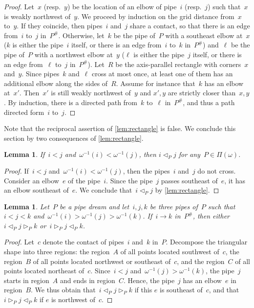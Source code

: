 \documentclass{amsart}
\newtheorem{lemma}[theorem]{Lemma}
\theoremstyle{definition}
\newcommand{\pipeDreams}{\Pi} %
\newcommand{\contact}{^\#} %
\newcommand{\less}{\vartriangleleft} %
\newcommand{\more}{\vartriangleright} %
\newcommand{\contactLess}[1]{\less_{#1}} %
\newcommand{\contactMore}[1]{\more_{#1}} %
\begin{document}
\begin{proof}
Let~$x$ (resp.~$y$) be the location of an elbow of pipe~$i$ (resp.~$j$) such that~$x$ is weakly northwest of~$y$.
We proceed by induction on the grid distance from~$x$ to~$y$.
If they coincide, then pipes~$i$ and~$j$ share a contact, so that there is an edge from~$i$ to~$j$ in~$P\contact$.
Otherwise, let~$k$ be the pipe of~$P$ with a southeast elbow at~$x$ ($k$ is either the pipe~$i$ itself, or there is an edge from~$i$ to~$k$ in~$P\contact$) and~$\ell$ be the pipe of~$P$ with a northwest elbow at~$y$ ($\ell$ is either the pipe~$j$ itself, or there is an edge from~$\ell$ to~$j$ in~$P\contact$).
Let~$R$ be the axis-parallel rectangle with corners~$x$ and~$y$.
Since pipes~$k$ and~$\ell$ cross at most once, at least one of them has an additional elbow along the sides of~$R$.
Assume for instance that~$k$ has an elbow at~$x'$.
Then~$x'$ is still weakly northwest of~$y$ and $x',y$ are strictly closer than~$x,y$.
By induction, there is a directed path from~$k$ to~$\ell$ in~$P\contact$, and thus a path directed form~$i$ to~$j$.
\end{proof}

Note that the reciprocal assertion of \cref{lem:rectangle} is false.
We conclude this section by two consequences of \cref{lem:rectangle}.

\begin{lemma}
\label{lem:consequenceRectangle1}
If~$i < j$ and~$\omega^{-1}(i) < \omega^{-1}(j)$, then $i \contactLess{P} j$ for any~$P \in \pipeDreams(\omega)$.
\end{lemma}

\begin{proof}
If~$i < j$ and~$\omega^{-1}(i) < \omega^{-1}(j)$, then the pipes~$i$ and~$j$ do not cross.
Consider an elbow~$e$ of the pipe~$i$.
Since the pipe~$j$ passes southeast of~$e$, it has an elbow southeast of~$e$.
We conclude that~$i \contactLess{P} j$ by \cref{lem:rectangle}.
\end{proof}

\begin{lemma}
\label{lem:consequenceRectangle2}
Let~$P$ be a pipe dream and let~$i,j,k$ be three pipes of~$P$ such that~$i < j < k$ and~$\omega^{-1}(i) > \omega^{-1}(j) > \omega^{-1}(k)$.
If~$i \to k$ in~$P\contact$, then either~$i \contactLess{P} j \contactMore{P} k$ or~$i \contactMore{P} j \contactLess{P} k$.
\end{lemma}

\begin{proof}
Let~$c$ denote the contact of pipes~$i$ and~$k$ in~$P$.
Decompose the triangular shape into three regions: the region~$A$ of all points located southwest of~$c$, the region~$B$ of all points located northwest or southeast of~$c$, and the region~$C$ of all points located northeast of~$c$.
Since~$i < j$ and~$\omega^{-1}(j) > \omega^{-1}(k)$, the pipe~$j$ starts in region~$A$ and ends in region~$C$.
Hence, the pipe~$j$ has an elbow~$e$ in region~$B$.
We thus obtain that~$i \contactLess{P} j \contactMore{P} k$ if this $e$ is southeast of~$c$, and that~$i \contactMore{P} j \contactLess{P} k$ if $e$ is northwest of~$c$.
\end{proof}
\end{document}
